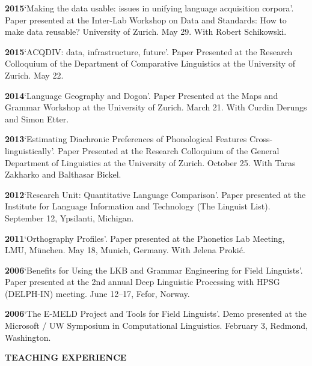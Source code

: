 \documentclass[11pt]{article}
\newcommand{\hangpara}{
 \setlength{\parindent}{0in} %
 \hangindent=0.42in %
}
\begin{document}
\hangpara
\vskip 6pt
{\bf 2015}\hspace{1ex}`Making the data usable: issues in unifying language acquisition corpora'. Paper presented at the Inter-Lab Workshop on Data and Standards: How to make data reusable? University of Zurich. May 29. With Robert Schikowski.

\vskip 6pt
\hangpara
{\bf 2015}\hspace{1ex}`ACQDIV: data, infrastructure, future'. Paper Presented at the Research Colloquium of the Department of Comparative Linguistics at the University of Zurich. May 22.

\vskip 6pt
\hangpara
{\bf 2014}\hspace{1ex}`Language Geography and Dogon'. Paper Presented at the Maps and Grammar Workshop at the University of Zurich. March 21. With Curdin Derungs and Simon Etter.

\vskip 6pt
\hangpara
{\bf 2013}\hspace{1ex}`Estimating Diachronic Preferences of Phonological Features Cross-linguistically'. Paper Presented at the Research Colloquium of the General Department of Linguistics at the University of Zurich. October 25. With Taras Zakharko and Balthasar Bickel.

\vskip 6pt
\hangpara
{\bf 2012}\hspace{1ex}`Research Unit: Quantitative Language Comparison'. Paper presented at the Institute for Language Information and Technology (The Linguist List). September 12, Ypsilanti, Michigan.

\vskip 6pt
\hangpara
{\bf 2011}\hspace{1ex}`Orthography Profiles'. Paper presented at the Phonetics Lab Meeting, LMU, M{\"u}nchen. May 18, Munich, Germany. With Jelena Proki{\'c}.

\vskip 6pt
\hangpara
{\bf 2006}\hspace{1ex}`Benefits for Using the LKB and Grammar Engineering for Field Linguists'. Paper presented at the 2nd annual Deep Linguistic Processing with HPSG (DELPH-IN) meeting. June 12--17, Fefor, Norway.

\vskip 6pt
\hangpara
{\bf 2006}\hspace{1ex}`The E-MELD Project and Tools for Field Linguists'. Demo presented at the Microsoft / UW Symposium in Computational Linguistics. February 3, Redmond, Washington.


\vskip 20pt
\begin{flushleft}
{\bf TEACHING EXPERIENCE}
\end{flushleft}
\end{document}
